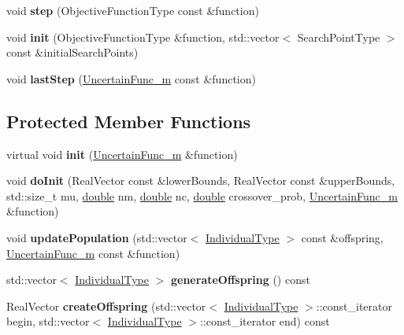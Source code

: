 \begin{DoxyCompactItemize}
\item 
void {\bfseries step} (Objective\+Function\+Type const \&function)\hypertarget{classSAPEOSMS_ae712a2fa3e483add19ca9e8b3a21149b}{}\label{classSAPEOSMS_ae712a2fa3e483add19ca9e8b3a21149b}

\item 
void {\bfseries init} (Objective\+Function\+Type \&function, std\+::vector$<$ Search\+Point\+Type $>$ const \&initial\+Search\+Points)\hypertarget{classSAPEOSMS_a342280ef2f829999f0074189974e8600}{}\label{classSAPEOSMS_a342280ef2f829999f0074189974e8600}

\item 
void {\bfseries last\+Step} (\hyperlink{classUncertainFunc__m}{Uncertain\+Func\+\_\+m} const \&function)\hypertarget{classSAPEOSMS_a97a98afcb691d3a2fa94839694ab869b}{}\label{classSAPEOSMS_a97a98afcb691d3a2fa94839694ab869b}

\end{DoxyCompactItemize}
\subsection*{Protected Member Functions}
\begin{DoxyCompactItemize}
\item 
virtual void {\bfseries init} (\hyperlink{classUncertainFunc__m}{Uncertain\+Func\+\_\+m} \&function)\hypertarget{classSAPEOSMS_a613a18393c100f32ef29dd20558d228b}{}\label{classSAPEOSMS_a613a18393c100f32ef29dd20558d228b}

\item 
void {\bfseries do\+Init} (Real\+Vector const \&lower\+Bounds, Real\+Vector const \&upper\+Bounds, std\+::size\+\_\+t mu, \hyperlink{classdouble}{double} nm, \hyperlink{classdouble}{double} nc, \hyperlink{classdouble}{double} crossover\+\_\+prob, \hyperlink{classUncertainFunc__m}{Uncertain\+Func\+\_\+m} \&function)\hypertarget{classSAPEOSMS_a1733dcc6ae21d1d62e95a3a4a1d94f5a}{}\label{classSAPEOSMS_a1733dcc6ae21d1d62e95a3a4a1d94f5a}

\item 
void {\bfseries update\+Population} (std\+::vector$<$ \hyperlink{classUncertainIndividual}{Individual\+Type} $>$ const \&offspring, \hyperlink{classUncertainFunc__m}{Uncertain\+Func\+\_\+m} const \&function)\hypertarget{classSAPEOSMS_a41b7c12930189080490230081378577e}{}\label{classSAPEOSMS_a41b7c12930189080490230081378577e}

\item 
std\+::vector$<$ \hyperlink{classUncertainIndividual}{Individual\+Type} $>$ {\bfseries generate\+Offspring} () const \hypertarget{classSAPEOSMS_ab826e0ba937791680630dddeeae331cd}{}\label{classSAPEOSMS_ab826e0ba937791680630dddeeae331cd}

\item 
Real\+Vector {\bfseries create\+Offspring} (std\+::vector$<$ \hyperlink{classUncertainIndividual}{Individual\+Type} $>$\+::const\+\_\+iterator begin, std\+::vector$<$ \hyperlink{classUncertainIndividual}{Individual\+Type} $>$\+::const\+\_\+iterator end) const \hypertarget{classSAPEOSMS_acc17d4f3aaad0a36939d83999bb356d5}{}\label{classSAPEOSMS_acc17d4f3aaad0a36939d83999bb356d5}

\end{DoxyCompactItemize}
